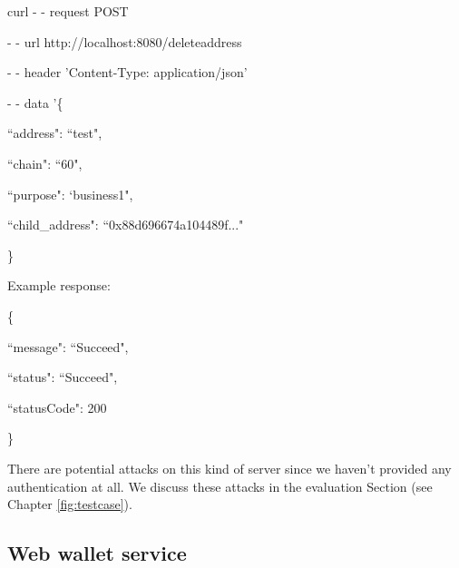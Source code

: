 \begin{framed}
\hspace*{13mm}    curl - - request POST \par
\hspace*{13mm}        - - url http://localhost:8080/deleteaddress \par
\hspace*{13mm}        - - header 'Content-Type: application/json' \par
\hspace*{13mm}        - - data '\{ \par
\hspace*{27mm}                ``address": ``test",  \par
\hspace*{40mm}                ``chain": ``60", \par
\hspace*{40mm}                ``purpose": `business1", \par
\hspace*{40mm}                ``child\_address": ``0x88d696674a104489f..." \par
\hspace*{27mm}              \} \par
\end{framed}

Example response:

\begin{framed}
    \hspace*{13mm}        \{ \par
    \hspace*{13mm}                ``message": ``Succeed",    \par
    \hspace*{13mm}                ``status": ``Succeed",    \par
    \hspace*{13mm}             ``statusCode": 200    \par
    \hspace*{13mm}                 \}    \par
\end{framed}

There are potential attacks on this kind of server since we haven’t provided any authentication at all. We discuss these attacks in the evaluation Section (see Chapter \ref{fig:testcase}).

\subsection{Web wallet service}
\label{webui}

